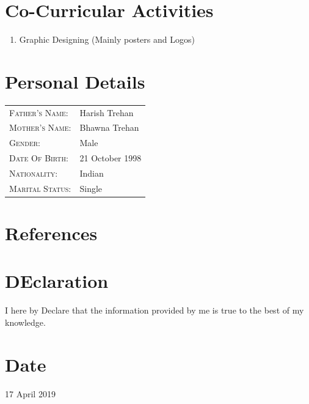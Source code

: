 \documentclass{my_cv}
\begin{document}
	\section{\colorbox{mycolor}{\textcolor{golde}{Co-Curricular Activities}}}
		\begin{enumerate}
			\item Graphic Designing (Mainly posters and Logos)
		\end{enumerate}
	
	
    \section{\colorbox{mycolor}{\textcolor{golde}{
    Personal Details}}}
 
 	\begin{tabular}{ll}
    	\textsc{Father's Name:} & Harish Trehan \\
    	\textsc{Mother's Name:}       & Bhawna Trehan \\
    	\textsc{Gender:}         & Male \\
    	\textsc{Date Of Birth:}         & 21 October 1998 \\
    	\textsc{Nationality:}   & Indian \\
    	\textsc{Marital Status:} & Single \\
    \end{tabular}
	\section{\colorbox{mycolor}{\textcolor{golde}{References}}}
	\section{\colorbox{mycolor}{\textcolor{golde}{DEclaration}}}
	I here by Declare that the information provided by me is true to the best of my knowledge.
	\section{\colorbox{mycolor}{\textcolor{golde}{Date}}}
	17 April 2019
	
\end{document}
